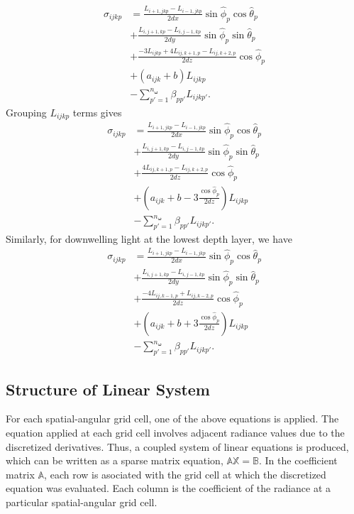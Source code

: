 \documentclass[ms,cpyr,lof,lot]{uathesis}
\renewcommand\vec\bm
\begin{document}
\begin{equation*}
  \begin{aligned}
    \sigma_{ijkp} &= \frac{L_{i+1,jkp}-L_{i-1,jkp}}{2dx}\sin\hat{\phi}_p\cos\hat{\theta}_p \\
    &+ \frac{L_{i,j+1,kp}-L_{i,j-1,kp}}{2dy}\sin\hat{\phi}_p\sin\hat{\theta}_p \\
    &+ \frac{-3L_{ijkp} + 4L_{ij,k+1,p} - L_{ij,k+2,p}}{2dz}\cos\hat{\phi}_p \\
    &+ (a_{ijk}+b)L_{ijkp} \\
    &- \sum_{p'=1}^{n_{\vec{\omega}}} \beta_{pp'} L_{ijkp'}.
  \end{aligned}
\end{equation*}
Grouping $L_{ijkp}$ terms gives
\begin{equation*}
  \begin{aligned}
    \sigma_{ijkp} &= \frac{L_{i+1,jkp}-L_{i-1,jkp}}{2dx}\sin\hat{\phi}_p\cos\hat{\theta}_p \\
    &+ \frac{L_{i,j+1,kp}-L_{i,j-1,kp}}{2dy}\sin\hat{\phi}_p\sin\hat{\theta}_p \\
    &+ \frac{4L_{ij,k+1,p} - L_{ij,k+2,p}}{2dz}\cos\hat{\phi}_p \\
    &+ \left(a_{ijk}+b - 3\frac{\cos\hat\phi_p}{2dz} \right)L_{ijkp} \\
    &- \sum_{p'=1}^{n_{\vec{\omega}}} \beta_{pp'} L_{ijkp'}.
  \end{aligned}
\end{equation*}
Similarly, for downwelling light at the lowest depth layer, we have
\begin{equation*}
  \begin{aligned}
    \sigma_{ijkp} &= \frac{L_{i+1,jkp}-L_{i-1,jkp}}{2dx}\sin\hat{\phi}_p\cos\hat{\theta}_p \\
    &+ \frac{L_{i,j+1,kp}-L_{i,j-1,kp}}{2dy}\sin\hat{\phi}_p\sin\hat{\theta}_p \\
    &+ \frac{-4L_{ij,k-1,p} + L_{ij,k-2,p}}{2dz}\cos\hat{\phi}_p \\
    &+ \left(a_{ijk}+b + 3\frac{\cos\hat\phi_p}{2dz} \right)L_{ijkp} \\
    &- \sum_{p'=1}^{n_{\vec{\omega}}} \beta_{pp'} L_{ijkp'}.
  \end{aligned}
\end{equation*}

\subsection{Structure of Linear System}
For each spatial-angular grid cell, one of the above equations is applied.
The equation applied at each grid cell involves adjacent radiance values due to the discretized derivatives.
Thus, a coupled system of linear equations is produced, which can be written as a sparse matrix equation, $\mathbb{AX=B}$.
In the coefficient matrix $\mathbb{A}$, each row is asociated with the grid cell at which the discretized equation was evaluated.
Each column is the coefficient of the radiance at a particular spatial-angular grid cell.
\end{document}
